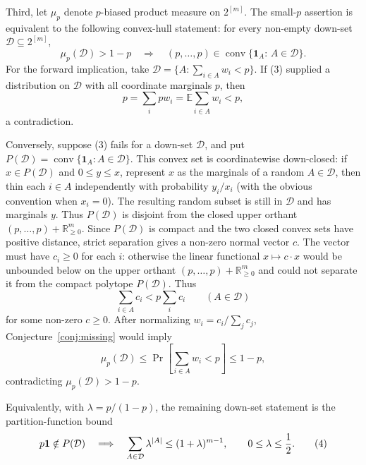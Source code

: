 \documentclass[12pt]{article}
\newcommand{\conv}{\operatorname{conv}}
\begin{document}
Third, let \(\mu_p\) denote \(p\)-biased product measure on \(2^{[m]}\).  The
small-\(p\) assertion is equivalent to the following convex-hull statement: for
every non-empty down-set \(\mathcal D\subseteq 2^{[m]}\),
\[
       \mu_p(\mathcal D)>1-p
       \quad\Longrightarrow\quad
       (p,\ldots,p)\in
       \conv\{\mathbf 1_A:\,A\in\mathcal D\}.             \tag{3}
\]
For the forward implication, take
\(\mathcal D=\{A:\sum_{i\in A}w_i<p\}\).  If (3) supplied a distribution on
\(\mathcal D\) with all coordinate marginals \(p\), then
\[
 p=\sum_i p w_i
   =\mathbb E\sum_{i\in A}w_i
   <p,
\]
a contradiction.

Conversely, suppose (3) fails for a down-set \(\mathcal D\), and put
\(P(\mathcal D)=\conv\{\mathbf1_A:A\in\mathcal D\}\).  This convex set is
coordinatewise down-closed: if \(x\in P(\mathcal D)\) and \(0\le y\le x\),
represent \(x\) as the marginals of a random \(A\in\mathcal D\), then thin each
\(i\in A\) independently with probability \(y_i/x_i\) (with the obvious
convention when \(x_i=0\)).  The resulting random subset is still in
\(\mathcal D\) and has marginals \(y\).  Thus \(P(\mathcal D)\) is disjoint
from the closed upper orthant
\((p,\ldots,p)+\mathbb R_{\ge0}^m\).  Since \(P(\mathcal D)\) is compact and
the two closed convex sets have positive distance, strict separation gives a
non-zero normal vector \(c\).  The vector must have \(c_i\ge0\) for
each \(i\): otherwise the linear functional \(x\mapsto c\cdot x\) would be
unbounded below on the upper orthant
\((p,\ldots,p)+\mathbb R_{\ge0}^m\) and could not separate it from the compact
polytope \(P(\mathcal D)\).  Thus
\[
      \sum_{i\in A}c_i < p\sum_i c_i
      \qquad(A\in\mathcal D)
\]
for some non-zero \(c\ge0\).
After normalizing \(w_i=c_i/\sum_jc_j\), Conjecture~\ref{conj:missing} would imply
\[
 \mu_p(\mathcal D)
 \le \Pr\!\left[\sum_{i\in A}w_i<p\right]\le1-p,
\]
contradicting \(\mu_p(\mathcal D)>1-p\).

Equivalently, with \(\lambda=p/(1-p)\), the remaining down-set statement is
the partition-function bound
\[
 p{\bf 1}\notin P(\mathcal D)
 \quad\Longrightarrow\quad
 \sum_{A\in\mathcal D}\lambda^{|A|}
 \le (1+\lambda)^{m-1},
 \qquad 0\le\lambda\le\frac12 .                         \tag{4}
\]
\end{document}
